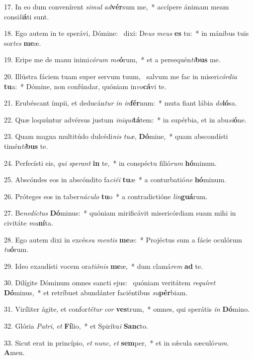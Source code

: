 17. In eo dum convenírent \textit{si}\textit{mul} \textit{ad}\textbf{vér}sum me,~*  accípere ánimam meam consi\textit{li}\textbf{á}ti sunt.\

18. Ego autem in te sperávi, Dómine: \dag\  dixi: De\textit{us} \textit{me}\textit{us} \textbf{es} tu:~*  in mánibus tuis sor\textit{tes} \textbf{me}æ.\

19. Eripe me de manu inimi\textit{có}\textit{rum} \textit{me}\textbf{ó}rum,~*  et a persequén\textit{ti}\textbf{bus} me.\

20. Illústra fáciem tuam super servum tuum, \dag\  salvum me fac in miseri\textit{cór}\textit{di}\textit{a} \textbf{tu}a:~*  Dómine, non confúndar, quóniam in\textit{vo}\textbf{cá}vi te.\

21. Erubéscant ímpii, et deducán\textit{tur} \textit{in} \textit{in}\textbf{fér}num:~*  muta fiant lábia \textit{do}\textbf{ló}sa.\

22. Quæ loquúntur advérsus justum \textit{in}\textit{i}\textit{qui}\textbf{tá}tem:~*  in supérbia, et in abu\textit{si}\textbf{ó}ne.\

23. Quam magna multitúdo dulcédi\textit{nis} \textit{tu}\textit{æ}, \textbf{Dó}mine,~*  quam abscondísti timén\textit{ti}\textbf{bus} te.\

24. Perfecísti eis, \textit{qui} \textit{spe}\textit{rant} \textbf{in} te,~*  in conspéctu filió\textit{rum} \textbf{hó}minum.\

25. Abscóndes eos in abscóndito fa\textit{ci}\textit{é}\textit{i} \textbf{tu}æ~*  a conturbatió\textit{ne} \textbf{hó}minum.\

26. Próteges eos in taber\textit{ná}\textit{cu}\textit{lo} \textbf{tu}o~*  a contradictióne \textit{lin}\textbf{guá}rum.\

27. Be\textit{ne}\textit{díc}\textit{tus} \textbf{Dó}minus:~*  quóniam mirificávit misericórdiam suam mihi in civitáte \textit{mu}\textbf{ní}ta.\

28. Ego autem dixi in excés\textit{su} \textit{men}\textit{tis} \textbf{me}æ:~*  Projéctus sum a fácie oculórum \textit{tu}\textbf{ó}rum.\

29. Ideo exaudísti vocem ora\textit{ti}\textit{ó}\textit{nis} \textbf{me}æ,~*  dum clamá\textit{rem} \textbf{ad} te.\

30. Dilígite Dóminum omnes sancti ejus: \dag\  quóniam veritátem \textit{re}\textit{quí}\textit{ret} \textbf{Dó}minus,~*  et retríbuet abundánter faciéntibus \textit{su}\textbf{pér}biam.\

31. Viríliter ágite, et confor\textit{té}\textit{tur} \textit{cor} \textbf{ves}trum,~*  omnes, qui sperátis \textit{in} \textbf{Dó}mino.\

32. Glória \textit{Pa}\textit{tri}, \textit{et} \textbf{Fí}lio,~*  et Spirítu\textit{i} \textbf{Sanc}to.\

33. Sicut erat in princípio, \textit{et} \textit{nunc}, \textit{et} \textbf{sem}per,~*  et in sǽcula sæculó\textit{rum}. \textbf{A}men.\

